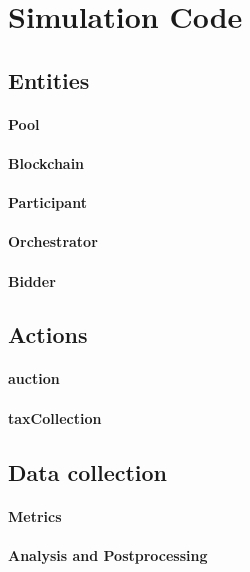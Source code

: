 \section{Simulation Code} \label{appendix:code}


\subsection{Entities}

\paragraph{Pool}
\paragraph{Blockchain}
\paragraph{Participant}
\paragraph{Orchestrator}
\paragraph{Bidder}

\subsection{Actions}

\paragraph{auction}
\paragraph{taxCollection}

\subsection{Data collection}

\paragraph{Metrics}
\paragraph{Analysis and Postprocessing}
